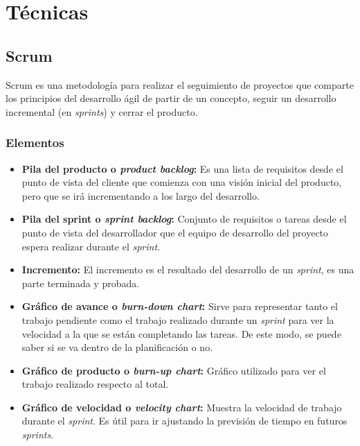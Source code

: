 
\section{Técnicas}
\subsection{Scrum}
Scrum es una metodología para realizar el seguimiento de proyectos que comparte los principios del desarrollo ágil de partir de un concepto, seguir un desarrollo incremental (en \textit{sprints}) y cerrar el producto.

\subsubsection{Elementos}
\begin{itemize}
\item \textbf{Pila del producto o \textit{product backlog}:}
Es una lista de requisitos desde el punto de vista del cliente que comienza con una visión inicial del producto, pero que se irá incrementando a los largo del desarrollo.

\item \textbf{Pila del sprint o \textit{sprint backlog}:}
Conjunto de requisitos o tareas desde el punto de vista del desarrollador que el equipo de desarrollo del proyecto espera realizar durante el \textit{sprint}.

\item \textbf{Incremento:}
El incremento es el resultado del desarrollo de un \textit{sprint}, es una parte terminada y probada. 

\item \textbf{Gráfico de avance o \textit{burn-down chart}:}
Sirve para representar tanto el trabajo pendiente como el trabajo realizado durante un \textit{sprint} para ver la velocidad a la que se están completando las tareas. De este modo, se puede saber si se va dentro de la planificación o no.

\item \textbf{Gráfico de producto o \textit{burn-up chart}:}
Gráfico utilizado para ver el trabajo realizado respecto al total.

\item \textbf{Gráfico de velocidad o \textit{velocity chart}:}
Muestra la velocidad de trabajo durante el \textit{sprint}. Es útil para ir ajustando la previsión de tiempo en futuros \textit{sprints}.
\end{itemize}


